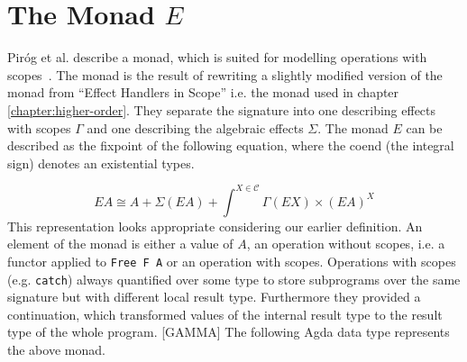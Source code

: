
\section{The Monad $E$}

Piróg et al. describe a monad, which is suited for modelling operations with
scopes~\cite{DBLP:conf/lics/PirogSWJ18}.
The monad is the result of rewriting a slightly modified version of the monad
from ``Effect Handlers in Scope'' i.e. the monad used in chapter
\ref{chapter:higher-order}.
They separate the signature into one describing effects with scopes $\Gamma$ and
one describing the algebraic effects $\Sigma$.
The monad $E$ can be described as the fixpoint of the following equation, where
the coend (the integral sign) denotes an existential types.

\[
  EA \cong A + \Sigma{}(EA) + \int^{X\in\mathscr{C}} \Gamma{}(EX) \times (EA)^X
\]
This representation looks appropriate considering our earlier definition.
An element of the monad is either a value of $A$, an operation without scopes,
i.e. a functor applied to \texttt{Free F A} or an operation with scopes.
Operations with scopes (e.g. \texttt{catch}) always quantified over some type to
store subprograms over the same signature but with different local result type.
Furthermore they provided a continuation, which transformed values of the
internal result type to the result type of the whole program.
[GAMMA]
The following Agda data type represents the above monad.

